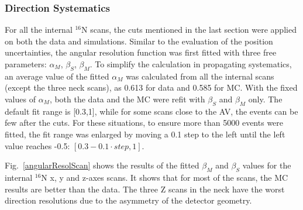 \subsubsection{Direction Systematics}
For all the internal $^{16}$N scans, the cuts mentioned in the last section were applied on both the data and simulations. Similar to the evaluation of the position uncertainties, the angular resolution function was first fitted with three free parameters: $\alpha_M$, $\beta_S$, $\beta_M$. To simplify the calculation in propagating systematics, an average value of the fitted $\alpha_M$ was calculated from all the internal scans (except the three neck scans), as 0.613 for data and 0.585 for MC. With the fixed values of $\alpha_M$, both the data and the MC were refit with $\beta_S$ and $\beta_M$ only. The default fit range is [0.3,1], while for some scans close to the AV, the events can be few after the cuts. For these situations, to ensure more than 5000 events were fitted, the fit range was enlarged by moving a 0.1 step to the left until the left value reaches -0.5: $[0.3-0.1\cdot step,1]$.

Fig.~\ref{angularResolScan} shows the results of the fitted $\beta_M$ and $\beta_S$ values for the internal $^{16}$N x, y and z-axes scans. It shows that for most of the scans, the MC results are better than the data. The three Z scans in the neck have the worst direction resolutions due to the asymmetry of the detector geometry. 

